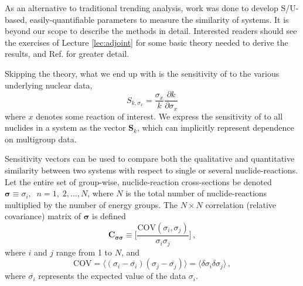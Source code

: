 As an alternative to traditional trending analysis, work was done to 
develop S/U-based, easily-quantifiable parameters to measure the 
similarity of systems.  It is beyond our scope to describe the 
methods in detail.  Interested readers should see the exercises
of Lecture \ref{lec:adjoint} for some
basic theory needed to derive the results, and Ref. 
\cite{broadhead2004sau} for greater detail.

Skipping the theory, what we end up with is the sensitivity
of \keff to the various underlying nuclear data, 
\begin{equation}
 S_{k,\sigma_x} = \frac{\sigma_x}{k}\frac{\partial k}{\partial \sigma_x} 
 \label{eq:keffsens}
\end{equation}
where $x$ denotes some reaction of interest.  We express the sensitivity 
of \keff to all nuclides in a system as the vector $\mathbf{S}_k$,
which can implicitly represent dependence on multigroup data.

Sensitivity vectors can be used to compare both the qualitative and 
quantitative similarity between two systems with respect to single or 
several nuclide-reactions. Let the entire set of group-wise, nuclide-reaction 
cross-sections be denoted 
$\bm{\sigma} \equiv \sigma_i, \; \; n = 1,\;2,\ldots,N$, where $N$ is the 
total number of nuclide-reactions multiplied by the number of energy 
groups.  The $N\times N$ correlation (\ie relative covariance) matrix 
of $\bm{\sigma}$ is defined
\begin{equation}
\mathbf{C_{\sigma \sigma}} \equiv \Bigg[\frac{\mathrm{COV}(\sigma_i,\sigma_j)}
                                             {\sigma_i \sigma_j} \Bigg ] \, ,
\end{equation}
where $i$ and $j$ range from 1 to $N$, and 
\begin{equation}
\mathrm{COV} = \langle (\sigma_i - \bar{\sigma_i})(\sigma_j - 
               \bar{\sigma_j}) \rangle 
             = \langle \delta \sigma_i \delta \sigma_j \rangle \, ,
\end{equation}
where $\bar{\sigma_i}$ represents the expected value of the data $\sigma_i$.  

